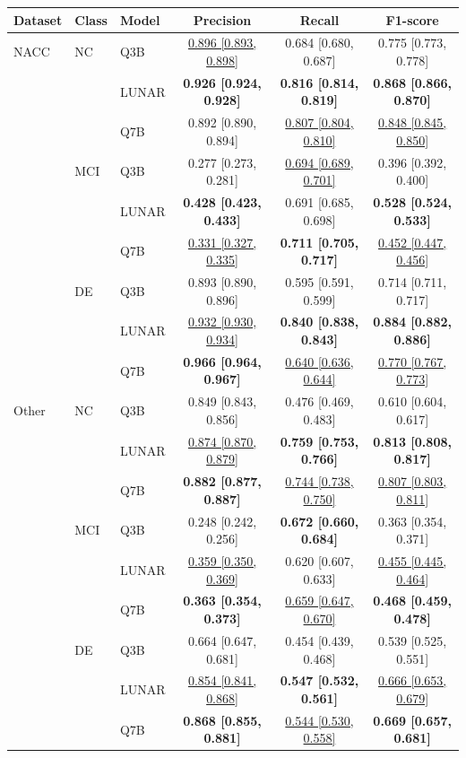 \begin{table}[ht]
\centering
\small
\begin{tabular}{lllccc}
\hline
Dataset & Class & Model & Precision & Recall & F1-score \\
\hline
NACC & NC & Q3B & \underline{0.896 [0.893, 0.898]} & 0.684 [0.680, 0.687] & 0.775 [0.773, 0.778] \\
 &  & LUNAR & \textbf{0.926 [0.924, 0.928]} & \textbf{0.816 [0.814, 0.819]} & \textbf{0.868 [0.866, 0.870]} \\
 &  & Q7B & 0.892 [0.890, 0.894] & \underline{0.807 [0.804, 0.810]} & \underline{0.848 [0.845, 0.850]} \\
\hline
 & MCI & Q3B & 0.277 [0.273, 0.281] & \underline{0.694 [0.689, 0.701]} & 0.396 [0.392, 0.400] \\
 &  & LUNAR & \textbf{0.428 [0.423, 0.433]} & 0.691 [0.685, 0.698] & \textbf{0.528 [0.524, 0.533]} \\
 &  & Q7B & \underline{0.331 [0.327, 0.335]} & \textbf{0.711 [0.705, 0.717]} & \underline{0.452 [0.447, 0.456]} \\
\hline
 & DE & Q3B & 0.893 [0.890, 0.896] & 0.595 [0.591, 0.599] & 0.714 [0.711, 0.717] \\
 &  & LUNAR & \underline{0.932 [0.930, 0.934]} & \textbf{0.840 [0.838, 0.843]} & \textbf{0.884 [0.882, 0.886]} \\
 &  & Q7B & \textbf{0.966 [0.964, 0.967]} & \underline{0.640 [0.636, 0.644]} & \underline{0.770 [0.767, 0.773]} \\
\hline
Other & NC & Q3B & 0.849 [0.843, 0.856] & 0.476 [0.469, 0.483] & 0.610 [0.604, 0.617] \\
 &  & LUNAR & \underline{0.874 [0.870, 0.879]} & \textbf{0.759 [0.753, 0.766]} & \textbf{0.813 [0.808, 0.817]} \\
 &  & Q7B & \textbf{0.882 [0.877, 0.887]} & \underline{0.744 [0.738, 0.750]} & \underline{0.807 [0.803, 0.811]} \\
\hline
 & MCI & Q3B & 0.248 [0.242, 0.256] & \textbf{0.672 [0.660, 0.684]} & 0.363 [0.354, 0.371] \\
 &  & LUNAR & \underline{0.359 [0.350, 0.369]} & 0.620 [0.607, 0.633] & \underline{0.455 [0.445, 0.464]} \\
 &  & Q7B & \textbf{0.363 [0.354, 0.373]} & \underline{0.659 [0.647, 0.670]} & \textbf{0.468 [0.459, 0.478]} \\
\hline
 & DE & Q3B & 0.664 [0.647, 0.681] & 0.454 [0.439, 0.468] & 0.539 [0.525, 0.551] \\
 &  & LUNAR & \underline{0.854 [0.841, 0.868]} & \textbf{0.547 [0.532, 0.561]} & \underline{0.666 [0.653, 0.679]} \\
 &  & Q7B & \textbf{0.868 [0.855, 0.881]} & \underline{0.544 [0.530, 0.558]} & \textbf{0.669 [0.657, 0.681]} \\
\hline
\end{tabular}
\end{table}